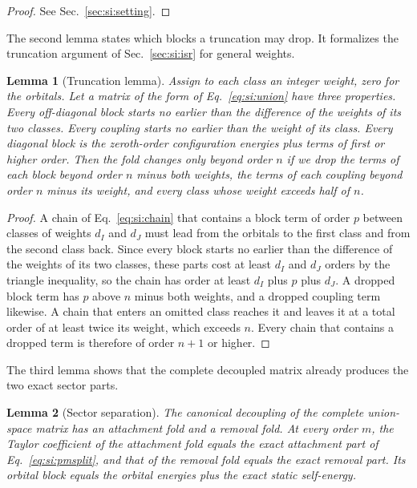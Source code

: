 \documentclass[aip,jcp,reprint,noshowkeys,superscriptaddress]{revtex4-2}
\theoremstyle{plain}
\newtheorem{lemma}{Lemma}
\theoremstyle{definition}
\theoremstyle{remark}
\begin{document}
\begin{proof}
See Sec.~\ref{sec:si:setting}.
\end{proof}

The second lemma states which blocks a truncation may drop. It formalizes the
truncation argument of Sec.~\ref{sec:si:isr} for general weights.

\begin{lemma}[Truncation lemma]
\label{lem:si:trunc}
Assign to each class an integer weight, zero for the orbitals. Let a matrix of
the form of Eq.~\eqref{eq:si:union} have three properties. Every off-diagonal
block starts no earlier than the difference of the weights of its two classes.
Every coupling starts no earlier than the weight of its class. Every diagonal
block is the zeroth-order configuration energies plus terms of first or higher
order. Then the fold changes only beyond order $n$ if we drop the terms of each
block beyond order $n$ minus both weights, the terms of each coupling beyond
order $n$ minus its weight, and every class whose weight exceeds half of $n$.
\end{lemma}

\begin{proof}
A chain of Eq.~\eqref{eq:si:chain} that contains a block term of order $p$
between classes of weights $d_I$ and $d_J$ must lead from the orbitals to the
first class and from the second class back. Since every block starts no earlier
than the difference of the weights of its two classes, these parts cost at least
$d_I$ and $d_J$ orders by the triangle inequality, so the chain has order at
least $d_I$ plus $p$ plus $d_J$. A dropped block term has $p$
above $n$ minus both weights, and a dropped coupling term likewise. A chain that
enters an omitted class reaches it and leaves it at a total order of at least
twice its weight, which exceeds $n$. Every chain that contains a dropped term
is therefore of order $n+1$ or higher.
\end{proof}

The third lemma shows that the complete decoupled matrix already produces the
two exact sector parts.

\begin{lemma}[Sector separation]
\label{lem:si:separation}
The canonical decoupling of the complete union-space matrix has an attachment
fold and a removal fold. At every order $m$, the Taylor coefficient of the
attachment fold equals the exact attachment part of Eq.~\eqref{eq:si:pmsplit},
and that of the removal fold equals the exact removal part. Its orbital block
equals the orbital energies plus the exact static self-energy.
\end{lemma}
\end{document}
